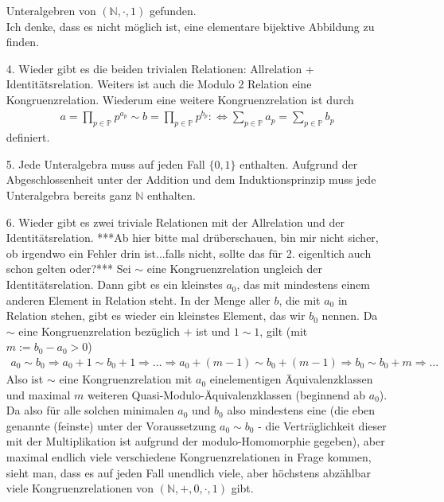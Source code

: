 \begin{solution}
\begin{itemize}
Unteralgebren von $(\mathbb{N},\cdot,1)$ gefunden. \\
Ich denke, dass es nicht möglich ist, eine elementare bijektive Abbildung zu finden.
\item [4.] Wieder gibt es die beiden trivialen Relationen: Allrelation + Identitätsrelation.
Weiters ist auch die Modulo 2 Relation eine Kongruenzrelation.
Wiederum eine weitere Kongruenzrelation ist durch
\begin{align*}
  a = \prod_{p \in \mathbb{P}}p^{a_p} \sim b = \prod_{p \in \mathbb{P}}p^{b_p}: \iff \sum_{p \in \mathbb{P}} a_p = \sum_{p \in \mathbb{P}} b_p
\end{align*}
definiert.
\item [5.] Jede Unteralgebra muss auf jeden Fall $\{0,1\}$ enthalten. Aufgrund
der Abgeschlossenheit unter der Addition und dem Induktionsprinzip
muss jede Unteralgebra bereits ganz $\mathbb{N}$ enthalten.
\item [6.] Wieder gibt es zwei triviale Relationen mit der Allrelation und der
Identitätsrelation.
\newline
***Ab hier bitte mal drüberschauen, bin mir nicht sicher, ob irgendwo ein Fehler drin ist...falls nicht, sollte das für 2. eigenltich auch schon gelten oder?*** Sei $\sim$ eine Kongruenzrelation ungleich der Identitätsrelation. Dann gibt es ein kleinstes $a_{0}$, das mit mindestens einem anderen Element in Relation steht. In der Menge aller $b$, die mit $a_{0}$ in Relation stehen, gibt es wieder ein kleinstes Element, das wir $b_{0}$ nennen. Da $\sim$ eine Kongruenzrelation bezüglich $+$ ist und $1 \sim 1$, gilt (mit $m := b_{0}-a_{0} > 0$)
\begin{align*}
  a_{0} \sim b_{0} \Rightarrow a_{0}+1 \sim b_{0}+1 \Rightarrow \dots \Rightarrow a_{0}+(m-1) \sim b_{0}+(m-1) \Rightarrow b_{0} \sim b_{0}+m \Rightarrow \dots
\end{align*}
Also ist $\sim$ eine Kongruenzrelation mit $a_{0}$ einelementigen Äquivalenzklassen und maximal $m$ weiteren Quasi-Modulo-Äquivalenzklassen (beginnend ab $a_{0}$).
Da also für alle solchen minimalen $a_{0}$ und $b_{0}$ also mindestens eine (die eben genannte (feinste) unter der Voraussetzung $a_{0} \sim b_{0}$ - die Verträglichkeit dieser mit der Multiplikation ist aufgrund der modulo-Homomorphie gegeben), aber maximal endlich viele verschiedene Kongruenzrelationen in Frage kommen, sieht man, dass es auf jeden Fall unendlich viele, aber höchstens abzählbar viele Kongruenzrelationen von $(\mathbb{N},+,0,\cdot,1)$ gibt.
\end{itemize}
\end{solution}
